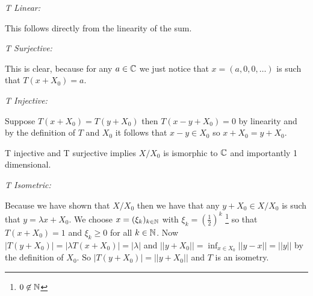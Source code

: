 \documentclass{unswmaths}
\begin{document}
\emph{T Linear: }

This follows directly from the linearity of the sum.

\emph{T Surjective: }

This is clear, because for any $ a \in \mathbb{C} $ we just notice that $ x = (a, 0, 0, \ldots ) $ is such that $ T(x + X_0) = a $.

\emph{T Injective: }

Suppose $ T(x + X_0) = T(y + X_0) $ then $ T(x -y  + X_0) = 0 $ by linearity and by the definition of $ T $ and $ X_0 $ it follows that $ x - y \in X_0 $ so $ x + X_0 = y + X_0 $.


T injective and T surjective implies $ X/X_0 $ is ismorphic to $ \mathbb{C} $ and importantly 1 dimensional.

\emph{T Isometric: }

Because we have shown that $ X/X_0 $ then we have that any $ y + X_0 \in X / X_0 $ is such that $ y = \lambda x + X_0 $. 
We choose $ x= (\xi_k )_{k \in \mathbb{N}} $ with $ \xi_k = \left(\frac{1}{2} \right)^k $ \footnote{ $ 0 \not\in \mathbb{N} $ } so that $ T(x + X_0) = 1 $ and $ \xi_k \geq 0 $ for all $ k \in \mathbb{N} $.
Now $ |T(y + X_0)| = |\lambda T(x+X_0)| = |\lambda| $ and $ ||y + X_0|| = \inf_{x \in X_0} ||y - x|| = ||y|| $ by the definition of $ X_0 $.
So $ |T(y + X_0)| = ||y + X_0 || $ and $ T $ is an isometry.
\end{document}
